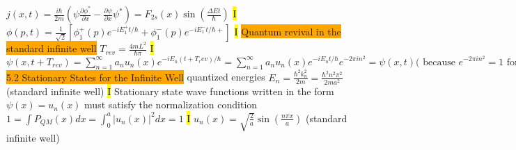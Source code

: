 \documentclass[fontsize=4pt]{scrartcl}
\begin{document}
$j(x,t) = \frac{i\hbar}{2m}(\psi \frac{\partial \phi^*}{\partial x} - \frac{\partial \psi}{\partial x}\psi^*) = F_{2s}(x)\sin(\frac{\Delta E t}{\hbar})$
\hl{I}
$\phi(p,t) = \frac{1}{\sqrt{2}}[\phi_1^+ (p) e^{-iE_1^+ t/\hbar} +\phi_1^- (p) e^{-iE_1^- t/\hbar + }]$
\hl{I}
\colorbox{Orange}{Quantum revival in the standard infinite well}
$T_{rev} = \frac{4mL^2}{\hbar \pi}$
\hl{I}
$\psi(x,t + T_{rev}) = \sum_{n=1}^{\infty} a_n u_n (x) e^{-iE_n (t+T_rev)/\hbar} =  \sum_{n=1}^{\infty} a_n u_n (x) e^{-iE_n t/\hbar }e^{-2\pi in^2} = \psi(x,t) ( \text{ because } e^{-2\pi in^2} = 1 \text{ for all } n  $
\colorbox{Orange}{5.2 Stationary States for the Infinite Well}
quantized energies $E_n = \frac{\hbar^2 k_n^2}{2m} = \frac{\hbar^2 n^2 \pi^2}{2ma^2}$ (standard infinite well)
\hl{I}
Stationary state wave functions written in the form $\psi(x) = u_n (x) $ must satisfy the normalization condition $1 = \int P_{QM}(x) dx = \int_{0}^{a} |u_n(x)|^2 dx = 1 $
\hl{I}
$u_n (x) = \sqrt{\frac{2}{a}}\sin(\frac{n\pi x}{a}) $ (standard infinite well)
\end{document}
